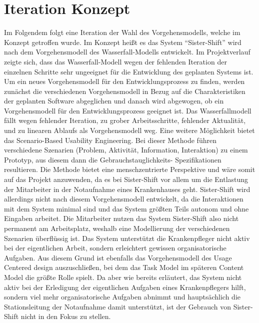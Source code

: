 \documentclass[11pt,
paper=a4,
bibtotocnumbered,	  %
liststotocnumbered,  %
DIV=calc,		  %
tablecaptionabove,	  %
headinclude,
]{article}
\begin{document}
\section{Iteration Konzept}
Im Folgendem folgt eine Iteration der Wahl des Vorgehensmodells, welche im Konzept getroffen wurde. Im Konzept heißt es das System “Sister-Shift” wird nach dem Vorgehensmodell des Wasserfall-Modells entwickelt. Im Projektverlauf zeigte sich, dass das Wasserfall-Modell wegen der fehlenden Iteration der einzelnen Schritte sehr ungeeignet für die Entwicklung des geplanten Systems ist. 
Um ein neues Vorgehensmodell für den Entwicklungsprozess zu finden, werden zunächst die verschiedenen Vorgehensmodell in Bezug auf die Charakteristiken der geplanten Software abgeglichen und danach wird abgewogen, ob ein Vorgehensmodell für den Entwicklungsprozess geeignet ist. 
Das Wasserfallmodell fällt wegen fehlender Iteration, zu grober Arbeitsschritte, fehlender Aktualität, und zu linearen Ablaufs als Vorgehensmodell weg. Eine weitere Möglichkeit bietet das Scenario-Based Usability Engineering. Bei dieser Methode führen verschiedene Szenarien (Problem, Aktivität, Information, Interaktion) zu einem Prototyp, aus diesem dann die Gebrauchstauglichkeits- Spezifikationen resultieren. Die Methode bietet eine menschzentrierte Perspektive und wäre somit auf das Projekt anzuwenden, da es bei Sister-Shift vor allem um die Entlastung der Mitarbeiter in der Notaufnahme eines Krankenhauses geht. Sister-Shift wird allerdings nicht nach diesem Vorgehensmodell entwickelt, da die Interaktionen mit dem System minimal sind und das System größten Teils autonom und ohne Eingaben arbeitet. Die Mitarbeiter nutzen das System Sister-Shift also nicht permanent am Arbeitsplatz, weshalb eine Modellierung der verschiedenen Szenarien überflüssig ist. Das System unterstützt die Krankenpfleger nicht aktiv bei der eigentlichen Arbeit, sondern erleichtert gewissen organisatorische Aufgaben. Aus diesem Grund ist ebenfalls das Vorgehensmodell des Usage Centered design auszuschließen, bei dem das Task Model im späteren Content Model die größte Rolle spielt. Da aber wie bereits erläutert, das System nicht aktiv bei der Erledigung der eigentlichen Aufgaben eines Krankenpflegers hilft, sondern viel mehr organisatorische Aufgaben abnimmt und hauptsächlich die Stationsleitung der Notaufnahme damit unterstützt, ist der Gebrauch von Sister-Shift nicht in den Fokus zu stellen. 
\end{document}
